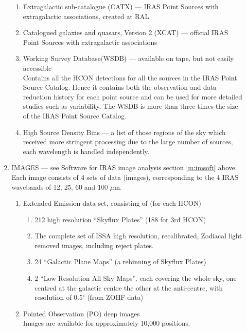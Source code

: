 \documentclass[11pt,nolof,noabs]{starlink}
\begin{document}
\begin{enumerate}
\begin{enumerate}
	\item Extragalactic sub-catalogue (CATX) --- IRAS Point Sources with
              extragalactic associations, created at RAL
        \item Catalogued galaxies and quasars, Version 2 (XCAT) --- official
              IRAS Point Sources with extragalactic associations
	\item Working Survey Database(WSDB) --- available on tape, but not
              easily accessible\\
              Contains all the HCON detections for all the sources in the
              IRAS Point Source Catalog.
              Hence it contains both the observation and data reduction
              history for each point source and can be used for more detailed
              studies such as variability.
	      The WSDB is more than three times the size of the IRAS Point
              Source Catalog.
	\item High Source Density Bins --- a list of those regions of the sky
              which received more stringent processing due to the large number
              of sources, each wavelength is handled independently.
	\end{enumerate}
\item IMAGES --- see Software for IRAS image analysis section \ref{m:imsoft}
above.
	Each image consists of 4 sets of data (images),
	corresponding to the 4 IRAS
	wavebands of 12, 25, 60 and 100 $\mu$m.
	\begin{enumerate}
	\item Extended Emission data set, consisting of (for each HCON)\\
		\begin{enumerate}
		\item 212 high resolution ``Skyflux Plates'' (188 for 3rd HCON)
                \item The complete set of ISSA high resolution, recalibrated,
                Zodiacal light removed images, including reject plates.
		\item 24 ``Galactic Plane Maps'' (a rebinning of Skyflux Plates)
		\item 2 ``Low Resolution All Sky Maps'', each covering the
		whole sky, one centred at the galactic centre the other
		at the anti-centre, with resolution of 0.5$^{\circ}$ (from
                ZOHF data)
		\end{enumerate}
	\item Pointed Observation (PO) deep images\\
        Images are available for approximately 10,000 positions.

\end{enumerate}
\end{enumerate}
\end{document}
